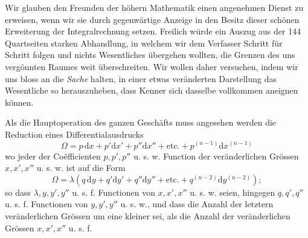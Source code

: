 Wir glauben den Freunden der höhern Mathematik einen angenehmen Dienst zu erweisen, wenn wir sie durch gegenwärtige Anzeige in den Besitz dieser schönen Erweiterung der Integralrechnung setzen. Freilich würde ein Auszug aus der 144 Quartseiten starken Abhandlung, in welchem wir dem Verfasser Schritt für Schritt folgen und nichts Wesentliches übergehen wollten, die Grenzen des uns vergönnten Raumes weit überschreiten. Wir wollen daher versuchen, indem wir uns bloss an die \textit{Sache} halten, in einer etwas veränderten Darstellung das Wesentliche so herauszuheben, dass Kenner sich dasselbe vollkommen aneignen können.

Als die Hauptoperation des ganzen Geschäfts muss angesehen werden die Reduction eines Differentialausdrucks
\[
\Omega=p\,\mathrm dx+p'\mathrm dx'+p''\mathrm dx''+\text{etc.}+p^{(n-1)}\mathrm dx^{(n-1)}
\]
wo jeder der Coëfficienten $p,p',p''$ u. s. w. Function der veränderlichen Grössen $x,x',x''$ u. s. w. ist auf die Form
\[
\Omega=\lambda(q\,\mathrm dy+q'\mathrm dy'+q''\mathrm dy''+\text{etc.}+q^{(n-2)}\mathrm dy^{(n-2)});
\]
so dass $\lambda,y,y',y''$ u. s. f. Functionen von $x,x',x''$ u. s. w. seien, hingegen $q,q',q''$ u. s. f. Functionen von $y,y',y''$ u. s. w., und dass die Anzahl der letztern veränderlichen Grössen um eine kleiner sei, als die Anzahl der veränderlichen Grössen $x,x',x''$ u. s. f.

